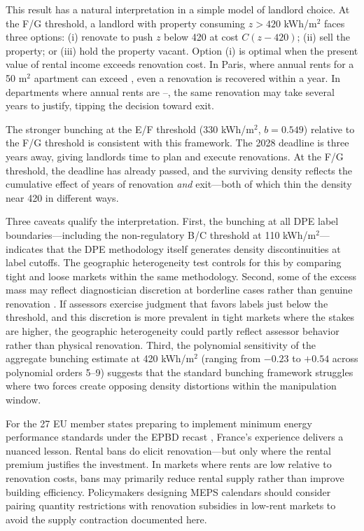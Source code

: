 \documentclass[12pt]{article}
\begin{document}
This result has a natural interpretation in a simple model of landlord choice. At the F/G threshold, a landlord with property consuming $z > 420$ kWh/m$^2$ faces three options: (i) renovate to push $z$ below 420 at cost $C(z - 420)$; (ii) sell the property; or (iii) hold the property vacant. Option (i) is optimal when the present value of rental income exceeds renovation cost. In Paris, where annual rents for a 50 m$^2$ apartment can exceed , even a  renovation is recovered within a year. In departments where annual rents are --, the same renovation may take several years to justify, tipping the decision toward exit.

The stronger bunching at the E/F threshold (330 kWh/m$^2$, $b = 0.549$) relative to the F/G threshold is consistent with this framework. The 2028 deadline is three years away, giving landlords time to plan and execute renovations. At the F/G threshold, the deadline has already passed, and the surviving density reflects the cumulative effect of years of renovation \textit{and} exit---both of which thin the density near 420 in different ways.

Three caveats qualify the interpretation. First, the bunching at all DPE label boundaries---including the non-regulatory B/C threshold at 110 kWh/m$^2$---indicates that the DPE methodology itself generates density discontinuities at label cutoffs. The geographic heterogeneity test controls for this by comparing tight and loose markets within the same methodology. Second, some of the excess mass may reflect diagnostician discretion at borderline cases rather than genuine renovation \citep{collins2018}. If assessors exercise judgment that favors labels just below the threshold, and this discretion is more prevalent in tight markets where the stakes are higher, the geographic heterogeneity could partly reflect assessor behavior rather than physical renovation. Third, the polynomial sensitivity of the aggregate bunching estimate at 420 kWh/m$^2$ (ranging from $-0.23$ to $+0.54$ across polynomial orders 5--9) suggests that the standard bunching framework struggles where two forces create opposing density distortions within the manipulation window.

For the 27 EU member states preparing to implement minimum energy performance standards under the EPBD recast \citep{epbd2024}, France's experience delivers a nuanced lesson. Rental bans do elicit renovation---but only where the rental premium justifies the investment. In markets where rents are low relative to renovation costs, bans may primarily reduce rental supply rather than improve building efficiency. Policymakers designing MEPS calendars should consider pairing quantity restrictions with renovation subsidies in low-rent markets to avoid the supply contraction documented here.
\end{document}
